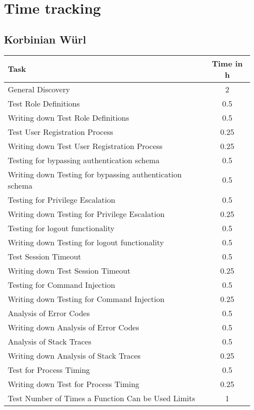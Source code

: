 \chapter{Time tracking}

\section{Korbinian Würl}
\begin{table}[H]
\tiny
\begin{tabular*}{\textwidth}{@{\extracolsep{\fill}} l c@{\extracolsep{0pt}} }
\textbf{Task} & \textbf{Time in h} \\ \hline
	General Discovery							& 2 \\
	Test Role Definitions						& 0.5\\
	Writing down Test Role Definitions			& 0.5\\
	Test User Registration Process				& 0.25\\
	Writing down Test User Registration Process	& 0.25\\
	Testing for bypassing authentication schema & 0.5\\
	Writing down Testing for bypassing authentication schema & 0.5 \\
	Testing for Privilege Escalation			& 0.5\\
	Writing down Testing for Privilege Escalation & 0.25\\
	Testing for logout functionality			& 0.5\\
	Writing down Testing for logout functionality & 0.5 \\
	Test Session Timeout						& 0.5 \\
	Writing down Test Session Timeout			& 0.25 \\
	Testing for Command Injection 				& 0.5 \\
	Writing down Testing for Command Injection 	& 0.25 \\
	Analysis of Error Codes	   					& 0.5\\
	Writing down Analysis of Error Codes	   	& 0.5 \\
	Analysis of Stack Traces 					& 0.5\\
	Writing down Analysis of Stack Traces 		& 0.25 \\
	Test for Process Timing 					& 0.5 \\
	Writing down Test for Process Timing 		& 0.25 \\
	Test Number of Times a Function Can be Used Limits & 1 \\

\end{tabular*}
\end{table}
